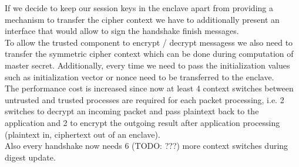 \documentclass[../main.tex]{subfiles}
\begin{document}
\noindent
If we decide to keep our session keys in the enclave apart from providing a
mechanism to transfer the cipher context we have to additionally present an
interface that would allow to sign the handshake finish messages.\\

\noindent
To allow the trusted component to encrypt / decrypt messagess we also need to
transfer the symmetric cipher context which can be done during computation of
master secret. Additionally, every time we need to pass the initialization
values such as initialization vector or nonce need to be transferred to the
enclave.\\

\noindent
The performance cost is increased since now at least 4 context switches
between untrusted and trusted processes are required for each packet
processing, i.e. 2 switches to decrypt an incoming packet and pass plaintext
back to the application and 2 to encrypt the outgoing result after application
processing (plaintext in, ciphertext out of an enclave).\\

\noindent
Also every handshake now needs 6 (TODO: ???) more context switches during
digest update.
\end{document}

